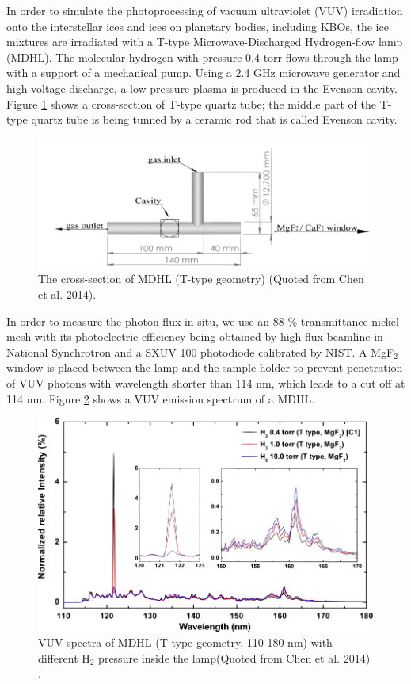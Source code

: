 In order to simulate the photoprocessing of vacuum ultraviolet (VUV) irradiation onto the interstellar ices and ices on planetary bodies, including KBOs, the ice mixtures are irradiated with a T-type Microwave-Discharged Hydrogen-flow lamp (MDHL). The molecular hydrogen with pressure 0.4 torr flows through the lamp with a support of a mechanical pump. Using a 2.4 GHz microwave generator and high voltage discharge, a low pressure plasma is produced in the Evenson cavity. Figure \ref{fig:T_type} shows a cross-section of T-type quartz tube; the middle part of the T-type quartz tube is being tunned by a ceramic rod that is called Evenson cavity.
\begin{figure}
\centering
\includegraphics[width=\textwidth]{figures/chapter2/T_type.png}
\caption{The cross-section of MDHL (T-type geometry) (Quoted from Chen et al. 2014).}
\label{fig:T_type}
\end{figure}
In order to measure the photon flux in situ, we use an 88 \% transmittance nickel mesh with its photoelectric efficiency being obtained by high-flux beamline in National Synchrotron and a SXUV 100 photodiode calibrated by NIST. A MgF$_2$ window is placed between the lamp and the sample holder to prevent penetration of VUV photons with wavelength shorter than 114 nm, which leads to a cut off at 114 nm. Figure \ref{fig:MDHL} shows a VUV emission spectrum of a MDHL.
\begin{figure}
\centering
\includegraphics[width=\textwidth]{figures/chapter2/MDHL.png}
\caption{VUV spectra of MDHL (T-type geometry, 110-180 nm) with different H$_2$ pressure inside the lamp(Quoted from Chen et al. 2014)\cite{chen2013vacuum} .}
\label{fig:MDHL}
\end{figure}
